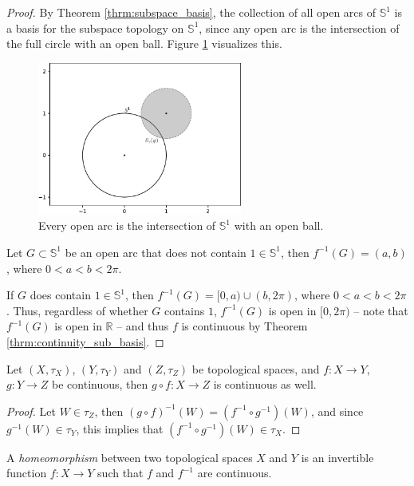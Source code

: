 \begin{proof}
	By Theorem \ref{thrm:subspace_basis}, the collection of all open arcs of $\mathbb S^1$ is a basis for the subspace topology on $\mathbb S^1$, since any open arc is the intersection of the full circle with an open ball. Figure \ref{fig:open_arc} visualizes this.
	\begin{figure}[h]
		\centering
		\includegraphics[width=0.6\textwidth]{Figures/circles_intersection_arc.pdf}
		\caption{Every open arc is the intersection of $\mathbb S^1$ with an open ball.}
		\label{fig:open_arc}
	\end{figure}
	
	Let $G\subset \mathbb S^1$ be an open arc that does not contain $1\in \mathbb S^1$, then $f^{-1}(G) = (a, b)$, where $0 < a < b < 2\pi$. 
	
	If $G$ does contain $1\in\mathbb S^1$, then $f^{-1}(G) = [0, a) \cup (b, 2\pi)$, where $0 < a < b < 2\pi$. Thus, regardless of whether $G$ contains $1$, $f^{-1}(G)$ is open in $[0, 2\pi)$ -- note that $f^{-1}(G)$ is open in $\mathbb R$ -- and thus $f$ is continuous by Theorem \ref{thrm:continuity_sub_basis}.
\end{proof}

\begin{theorem}\label{thrm:composition_continuous_functions}
	Let $(X, \tau_X)$, $(Y, \tau_Y)$ and $(Z, \tau_Z)$ be topological spaces, and $f: X\to Y$, $g: Y\to Z$ be continuous, then $g\circ f: X\to Z$ is continuous as well.
\end{theorem}

\begin{proof}
	Let $W\in\tau_Z$, then $(g\circ f)^{-1}(W) = (f^{-1}\circ g^{-1})(W)$, and since $g^{-1}(W)\in \tau_Y$, this implies that $(f^{-1}\circ g^{-1})(W)\in\tau_X$.
\end{proof}

\begin{defn} A \textit{homeomorphism} between two topological spaces $X$ and $Y$ is an invertible function $f: X\rightarrow Y$ such that $f$ and $f^{-1}$ are continuous. 
\end{defn}


